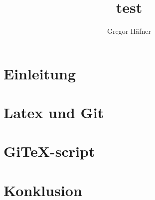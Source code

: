 \documentclass[12pt,a4paper]{scrartcl}
\author{Gregor Häfner}
\title{test}
\begin{document}
\maketitle
\tableofcontents

\section{Einleitung}



\section{Latex und Git}



\section{GiTeX-script}



\section{Konklusion}
\end{document}
